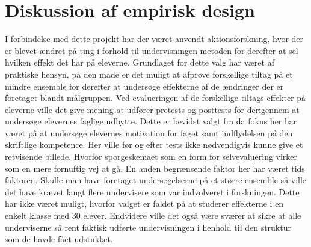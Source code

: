 \section{Diskussion af empirisk design}
\label{sec:des}
I forbindelse med dette projekt har der været anvendt aktionsforskning, hvor der er blevet ændret på ting i forhold til undervisningen metoden for derefter at sel hvilken effekt det har på eleverne. Grundlaget for dette valg har været af praktiske hensyn, på den måde er det muligt at afprøve forskellige tiltag på et mindre ensemble for derefter at undersøge effekterne af de ændringer der er foretaget blandt målgruppen. Ved evalueringen af de forskellige tiltags effekter på eleverne ville det give mening at udfører pretests og posttests for derigennem at undersøge elevernes faglige udbytte. Dette er bevidst valgt fra da fokus her har været på at undersøge elevernes motivation for faget samt indflydelsen på den skriftlige kompetence. Her ville før og efter tests ikke nødvendigvis kunne give et retvisende billede. Hvorfor spørgeskemaet som en form for selvevaluering virker som en mere fornuftig vej at gå.  En anden begrænsende faktor her har været tids faktoren. Skulle man have foretaget undersøgelserne på et større ensemble så ville det have krævet langt flere undervisere som var indvolveret i forskningen. Dette har ikke været muligt, hvorfor valget er faldet på at studerer effekterne i en enkelt klasse med 30 elever. Endvidere ville det også være sværer at sikre at alle underviserne så rent faktisk udførte undervisningen i henhold til den struktur som de havde fået udstukket. 
